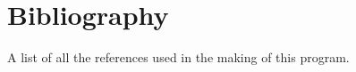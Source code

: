 \chapter{Bibliography}
\hypertarget{_bibliography}{}\label{_bibliography}
A list of all the references used in the making of this program.
